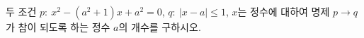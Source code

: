 두 조건 $p:\ x^2-(a^2+1)x+a^2=0$, $q:\ |x-a|\le 1$, $x$는 정수에 대하여 명제 $p\longrightarrow q$가 참이 되도록 하는 정수 $a$의 개수를 구하시오.
